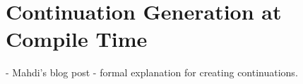\section{Continuation Generation at Compile Time}
\label{comp}
- Mahdi's blog post 
- formal explanation for creating continuations.
